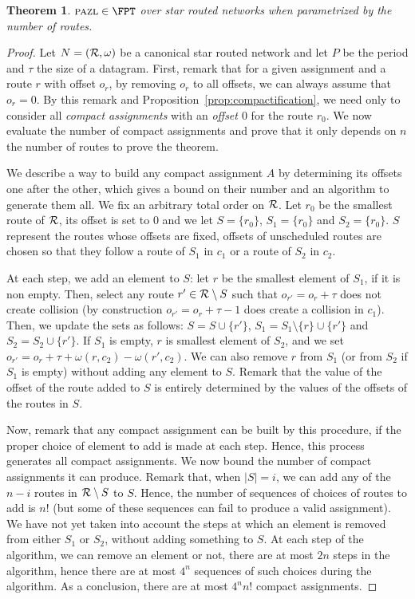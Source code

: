 \documentclass[a4paper,10pt]{journal}
\newtheorem{theorem}{Theorem}
\newcommand\pazl{\textsc{pazl}\xspace}
\begin{document}
\begin{theorem}\label{th:FPT}
$\pazl \in \FPT$ over star routed networks when parametrized by the number of routes.
\end{theorem}
\begin{proof}
Let $N = ({\cal R},\omega)$ be a canonical star routed network and let $P$ be the period and $\tau$ the size of a datagram. First, remark that for a given assignment and a route $r$ with offset $o_r$, by removing $o_r$ to all offsets, we can always assume that $o_r = 0$. By this remark and Proposition~\ref{prop:compactification}, we need only to consider all \emph{compact assignments} with an \emph{offset $0$} for the route $r_0$. We now evaluate the number of compact assignments and prove that it only depends on $n$ the number of routes to prove the theorem.

 We describe a way to build any compact assignment $A$ by determining its offsets one after the other, which gives a bound on their number and an algorithm to generate them all. We fix an arbitrary total order on ${\cal R}$. Let $r_0$ be the smallest route of $\cal{R}$, its offset is set to $0$ and we let $S = \{r_0\}$,
 $S_1 = \{r_0\}$ and $S_2 = \{r_0\}$. $S$ represent the routes whose offsets are fixed, 
 offsets of unscheduled routes are chosen so that they follow a route of $S_1$ in $c_1$ or a route of $S_2$ in $c_2$.

 At each step, we add an element to $S$: let $r$ be the smallest element of $S_1$, if it is non empty. Then, select any route $r' \in {\cal R} \setminus S$ 
 such that $o_{r'} = o_{r} + \tau$ does not create collision (by construction $o_{r'} = o_{r} + \tau - 1$ does create a collision in $c_1$). Then, we update the sets as follows:
 $S = S \cup \{r'\}$, $S_1 = S_1 \setminus \{r\} \cup \{r'\}$ and $S_2 = S_2 \cup \{r'\}$. If 
 $S_1$ is empty, $r$ is smallest element of $S_2$, and we set $o_{r'} = o_{r} + \tau + \omega(r,c_2) - \omega(r',c_2)$.
 We can also remove $r$ from $S_1$ (or from $S_2$ if $S_1$ is empty) without adding any element to $S$. Remark that the value of the offset of the route added to $S$ is entirely determined by the values of the offsets of the routes in $S$.

 Now, remark that any compact assignment can be built by this procedure, if the proper choice of element to add is made at each step. Hence, this process generates all compact assignments. We now bound the number of compact assignments it can produce. Remark that, when $|S| = i$, we can add any of the $n-i$ routes in ${\cal R} \setminus S$ to $S$. Hence, the number of sequences of choices of routes to add is $n!$ (but some of these sequences can fail to produce a valid assignment). We have not yet taken into account the steps at which an element is removed from either $S_1$ or $S_2$, without adding something to $S$. At each step of the algorithm, we can remove an element or not, there are at most $2n$ steps in the algorithm, hence there are at most $4^n$ sequences of such choices during the algorithm. As a conclusion, there are at most $4^nn!$ compact assignments.


\end{proof}
\end{document}
